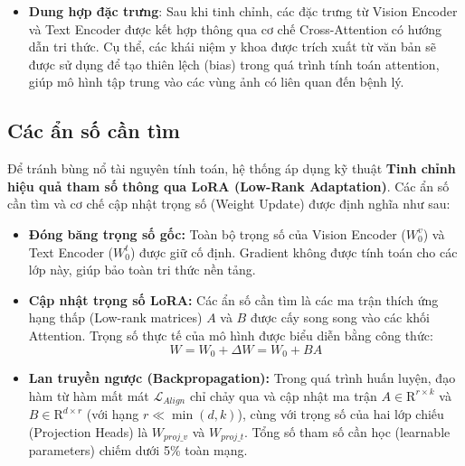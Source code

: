 \begin{itemize}
    \item \textbf{Dung hợp đặc trưng}: Sau khi tinh chỉnh, các đặc trưng từ Vision Encoder và Text Encoder được kết hợp thông qua cơ chế Cross-Attention có hướng dẫn tri thức. Cụ thể, các khái niệm y khoa được trích xuất từ văn bản sẽ được sử dụng để tạo thiên lệch (bias) trong quá trình tính toán attention, giúp mô hình tập trung vào các vùng ảnh có liên quan đến bệnh lý.
\end{itemize}

\subsection{Các ẩn số cần tìm}
Để tránh bùng nổ tài nguyên tính toán, hệ thống áp dụng kỹ thuật \textbf{Tinh chỉnh hiệu quả tham số thông qua LoRA (Low-Rank Adaptation)}. Các ẩn số cần tìm và cơ chế cập nhật trọng số (Weight Update) được định nghĩa như sau:

\begin{itemize}
    \item \textbf{Đóng băng trọng số gốc:} Toàn bộ trọng số của Vision Encoder ($W_{0}^{v}$) và Text Encoder ($W_{0}^{t}$) được giữ cố định. Gradient không được tính toán cho các lớp này, giúp bảo toàn tri thức nền tảng.
    \item \textbf{Cập nhật trọng số LoRA:} Các ẩn số cần tìm là các ma trận thích ứng hạng thấp (Low-rank matrices) $A$ và $B$ được cấy song song vào các khối Attention. Trọng số thực tế của mô hình được biểu diễn bằng công thức:
    \begin{equation}
        W = W_0 + \Delta W = W_0 + BA
    \end{equation}
    \item \textbf{Lan truyền ngược (Backpropagation):} Trong quá trình huấn luyện, đạo hàm từ hàm mất mát $\mathcal{L}_{Align}$ chỉ chảy qua và cập nhật ma trận $A \in \mathrm{R}^{r \times k}$ và $B \in \mathrm{R}^{d \times r}$ (với hạng $r \ll \min(d, k)$), cùng với trọng số của hai lớp chiếu (Projection Heads) là $W_{proj\_v}$ và $W_{proj\_t}$. Tổng số tham số cần học (learnable parameters) chiếm dưới 5\% toàn mạng.
\end{itemize}

